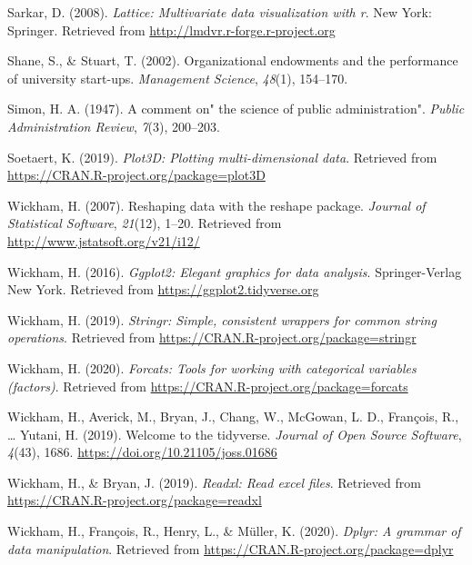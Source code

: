 \documentclass[
  english,
  man]{apa6}
\begin{document}
\leavevmode\hypertarget{ref-R-lattice}{}%
Sarkar, D. (2008). \emph{Lattice: Multivariate data visualization with r}. New York: Springer. Retrieved from \url{http://lmdvr.r-forge.r-project.org}

\leavevmode\hypertarget{ref-shane2002organizational}{}%
Shane, S., \& Stuart, T. (2002). Organizational endowments and the performance of university start-ups. \emph{Management Science}, \emph{48}(1), 154--170.

\leavevmode\hypertarget{ref-simon1947comment}{}%
Simon, H. A. (1947). A comment on" the science of public administration". \emph{Public Administration Review}, \emph{7}(3), 200--203.

\leavevmode\hypertarget{ref-R-plot3D}{}%
Soetaert, K. (2019). \emph{Plot3D: Plotting multi-dimensional data}. Retrieved from \url{https://CRAN.R-project.org/package=plot3D}

\leavevmode\hypertarget{ref-R-reshape2}{}%
Wickham, H. (2007). Reshaping data with the reshape package. \emph{Journal of Statistical Software}, \emph{21}(12), 1--20. Retrieved from \url{http://www.jstatsoft.org/v21/i12/}

\leavevmode\hypertarget{ref-R-ggplot2}{}%
Wickham, H. (2016). \emph{Ggplot2: Elegant graphics for data analysis}. Springer-Verlag New York. Retrieved from \url{https://ggplot2.tidyverse.org}

\leavevmode\hypertarget{ref-R-stringr}{}%
Wickham, H. (2019). \emph{Stringr: Simple, consistent wrappers for common string operations}. Retrieved from \url{https://CRAN.R-project.org/package=stringr}

\leavevmode\hypertarget{ref-R-forcats}{}%
Wickham, H. (2020). \emph{Forcats: Tools for working with categorical variables (factors)}. Retrieved from \url{https://CRAN.R-project.org/package=forcats}

\leavevmode\hypertarget{ref-R-tidyverse}{}%
Wickham, H., Averick, M., Bryan, J., Chang, W., McGowan, L. D., François, R., \ldots{} Yutani, H. (2019). Welcome to the tidyverse. \emph{Journal of Open Source Software}, \emph{4}(43), 1686. \url{https://doi.org/10.21105/joss.01686}

\leavevmode\hypertarget{ref-R-readxl}{}%
Wickham, H., \& Bryan, J. (2019). \emph{Readxl: Read excel files}. Retrieved from \url{https://CRAN.R-project.org/package=readxl}

\leavevmode\hypertarget{ref-R-dplyr}{}%
Wickham, H., François, R., Henry, L., \& Müller, K. (2020). \emph{Dplyr: A grammar of data manipulation}. Retrieved from \url{https://CRAN.R-project.org/package=dplyr}
\end{document}
